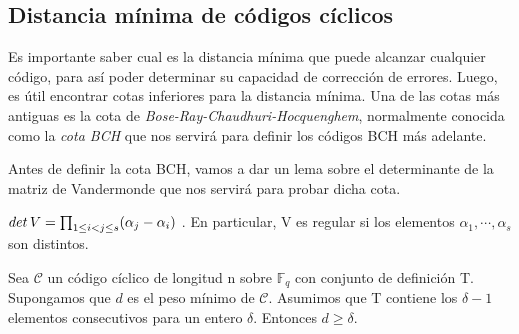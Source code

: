 \subsection{Distancia mínima de códigos cíclicos}
 
 Es importante saber cual es la  distancia mínima que puede alcanzar cualquier código, para así poder determinar su capacidad de corrección de errores. Luego, es útil encontrar cotas inferiores para la distancia mínima. Una de las cotas más antiguas es la cota de \textit{Bose-Ray-Chaudhuri-Hocquenghem}, normalmente conocida como la \textit{cota BCH} que nos servirá para definir los códigos BCH más adelante. 
 
 Antes de definir la cota BCH, vamos a dar un lema sobre el determinante de la matriz de Vandermonde que nos servirá para probar dicha cota.
 
 \begin{lemma}
 \label{le:vandermonde}
 $det \thinspace V = \prod_{1 \leq i < j \leq s} (\alpha_j - \alpha_i)$ . En particular, V es regular si los elementos $\alpha_1, \cdots, \alpha_s$ son distintos.
 \end{lemma}


\begin{theorem}
\label{th:cota_bch}
Sea $\mathcal{C}$ un código cíclico de longitud n sobre $\mathbb{F}_q$ con conjunto de definición T. Supongamos que $d$ es el peso mínimo de $\mathcal{C}$. Asumimos que T contiene los $\delta -1$ elementos consecutivos para un entero $\delta$. Entonces $d \geq \delta$.
\end{theorem}


